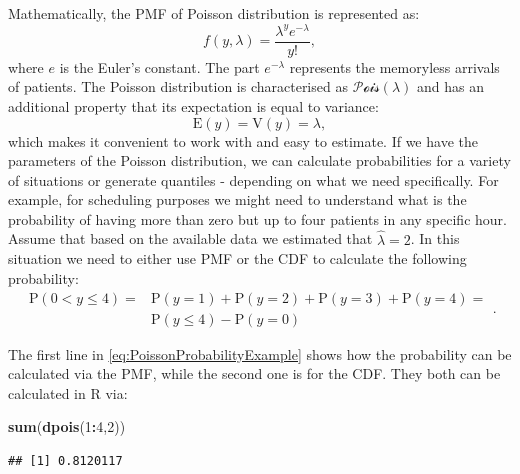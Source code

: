 \documentclass[
]{book}
\newenvironment{Shaded}{\begin{snugshade}}{\end{snugshade}}
\newcommand{\DecValTok}[1]{\textcolor[rgb]{0.00,0.00,0.81}{#1}}
\newcommand{\FunctionTok}[1]{\textcolor[rgb]{0.13,0.29,0.53}{\textbf{#1}}}
\newcommand{\NormalTok}[1]{#1}
\newcommand{\SpecialCharTok}[1]{\textcolor[rgb]{0.81,0.36,0.00}{\textbf{#1}}}
\theoremstyle{definition}
\theoremstyle{definition}
\theoremstyle{definition}
\theoremstyle{definition}
\theoremstyle{remark}
\begin{document}
Mathematically, the PMF of Poisson distribution is represented as:
\begin{equation}
    f(y, \lambda) = \frac{\lambda^y e^{-\lambda}}{y!} ,
    \label{eq:PoissonPMF}
\end{equation}
where \(e\) is the Euler's constant. The part \(e^{-\lambda}\) represents the memoryless arrivals of patients. The Poisson distribution is characterised as \(\mathcal{Pois}(\lambda)\) and has an additional property that its expectation is equal to variance:
\begin{equation}
    \mathrm{E}(y) = \mathrm{V}(y) = \lambda ,
    \label{eq:PoissonMean}
\end{equation}
which makes it convenient to work with and easy to estimate. If we have the parameters of the Poisson distribution, we can calculate probabilities for a variety of situations or generate quantiles - depending on what we need specifically. For example, for scheduling purposes we might need to understand what is the probability of having more than zero but up to four patients in any specific hour. Assume that based on the available data we estimated that \(\hat{\lambda}=2\). In this situation we need to either use PMF or the CDF to calculate the following probability:
\begin{equation}
    \begin{aligned}
        \mathrm{P}(0 < y \leq 4) = & \mathrm{P}(y=1) + \mathrm{P}(y=2) + \mathrm{P}(y=3) + \mathrm{P}(y=4) = \\
                                   & \mathrm{P}(y \leq 4) - \mathrm{P}(y=0)
    \end{aligned} .
    \label{eq:PoissonProbabilityExample}
\end{equation}

The first line in \eqref{eq:PoissonProbabilityExample} shows how the probability can be calculated via the PMF, while the second one is for the CDF. They both can be calculated in R via:

\begin{Shaded}
\begin{Highlighting}[]
\FunctionTok{sum}\NormalTok{(}\FunctionTok{dpois}\NormalTok{(}\DecValTok{1}\SpecialCharTok{:}\DecValTok{4}\NormalTok{,}\DecValTok{2}\NormalTok{))}
\end{Highlighting}
\end{Shaded}

\begin{verbatim}
## [1] 0.8120117
\end{verbatim}
\end{document}
